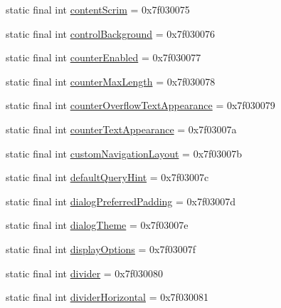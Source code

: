 \begin{DoxyCompactItemize}
\item 
static final int \mbox{\hyperlink{classandroid_1_1support_1_1design_1_1R_1_1attr_aa8a14d5b4064a43c901ed8f487694a90}{content\+Scrim}} = 0x7f030075
\item 
static final int \mbox{\hyperlink{classandroid_1_1support_1_1design_1_1R_1_1attr_aa9c8ead3946ee0ead67bb68d1108f94a}{control\+Background}} = 0x7f030076
\item 
static final int \mbox{\hyperlink{classandroid_1_1support_1_1design_1_1R_1_1attr_a4de2b94277e96c8145f1da466e15ee46}{counter\+Enabled}} = 0x7f030077
\item 
static final int \mbox{\hyperlink{classandroid_1_1support_1_1design_1_1R_1_1attr_a0154de85ff5adabd99acceeec4668a7e}{counter\+Max\+Length}} = 0x7f030078
\item 
static final int \mbox{\hyperlink{classandroid_1_1support_1_1design_1_1R_1_1attr_a9dd2184e532ad7d0a3d17e30eed3ce96}{counter\+Overflow\+Text\+Appearance}} = 0x7f030079
\item 
static final int \mbox{\hyperlink{classandroid_1_1support_1_1design_1_1R_1_1attr_a9247391b6a23b8ee731419c16f5eaf4b}{counter\+Text\+Appearance}} = 0x7f03007a
\item 
static final int \mbox{\hyperlink{classandroid_1_1support_1_1design_1_1R_1_1attr_a547b2301cd4621ac6ea5496b9664a48a}{custom\+Navigation\+Layout}} = 0x7f03007b
\item 
static final int \mbox{\hyperlink{classandroid_1_1support_1_1design_1_1R_1_1attr_acaec52b5bbfc9784046add642d100758}{default\+Query\+Hint}} = 0x7f03007c
\item 
static final int \mbox{\hyperlink{classandroid_1_1support_1_1design_1_1R_1_1attr_a9fa2a0152120967429584cb510c55ef2}{dialog\+Preferred\+Padding}} = 0x7f03007d
\item 
static final int \mbox{\hyperlink{classandroid_1_1support_1_1design_1_1R_1_1attr_a591c5c254647c58b1ce1ab9dff81f91a}{dialog\+Theme}} = 0x7f03007e
\item 
static final int \mbox{\hyperlink{classandroid_1_1support_1_1design_1_1R_1_1attr_a93c1aae4701355ebdf9580afa1586c65}{display\+Options}} = 0x7f03007f
\item 
static final int \mbox{\hyperlink{classandroid_1_1support_1_1design_1_1R_1_1attr_ae104d6437ed6e2bcdf6d19e7512c698f}{divider}} = 0x7f030080
\item 
static final int \mbox{\hyperlink{classandroid_1_1support_1_1design_1_1R_1_1attr_a5c3d002a620e4a91207c532d94baff2e}{divider\+Horizontal}} = 0x7f030081
\item 

\end{DoxyCompactItemize}
